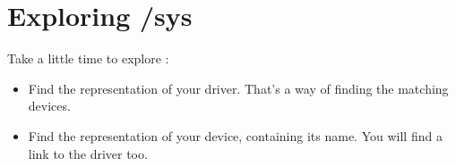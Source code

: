 \section{Exploring /sys}

Take a little time to explore :

\begin{itemize}
\item Find the representation of your driver. That's a way
      of finding the matching devices.
\item Find the representation of your device, containing its name.
      You will find a link to the driver too.
\end{itemize}
